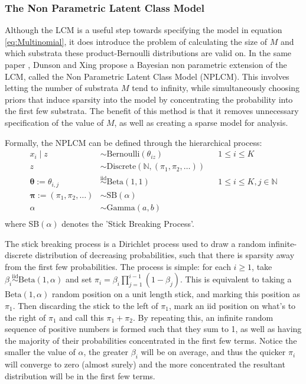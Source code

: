 \documentclass[10pt,a4paper,notitlepage]{article}
\newcommand{\N}{\mathbb{N}}
\newcommand{\iid}{\stackrel{\text{iid}}{\sim}}
\begin{document}
\subsubsection*{The Non Parametric Latent Class Model}
Although the LCM is a useful step towards specifying the model in equation \eqref{eq:Multinomial}, it does introduce the problem of calculating the size of $M$ and which substrata these product-Bernoulli distributions are valid on. In the same paper \cite{BinomialMixingGood}, Dunson and Xing propose a Bayesian non parametric extension of the LCM, called the Non Parametric Latent Class Model (NPLCM). This involves letting the number of substrata $M$ tend to infinity, while simultaneously choosing priors that induce sparsity into the model by concentrating the probability into the first few substrata. The benefit of this method is that it removes unnecessary specification of the value of $M$, as well as creating a sparse model for analysis.

Formally, the NPLCM can be defined through the hierarchical process:
\begin{align*}
x_{i} \mid z &\sim \text{Bernoulli}(\theta_{iz})  & &1\leq i\leq K\\
z &\sim \text{Discrete}(\N,(\pi_{1},\pi_{2}, \hdots)) & &\\
\bm{\theta}:= \theta_{i,j} &\iid \text{Beta}(1,1) & &1\leq i\leq K, j\in\N\\
\bm{\pi} := (\pi_{1},\pi_{2},\hdots ) &\sim \text{SB}(\alpha) &&\\
\alpha &\sim \text{Gamma}(a,b) &&\\
\end{align*}
where SB$(\alpha)$ denotes the 'Stick Breaking Process'.

The stick breaking process is a Dirichlet process used to draw a random infinite-discrete distribution of decreasing probabilities, such that there is sparsity away from the first few probabilities. The process is simple: for each $i\geq 1$, take $\beta_{i}\iid\text{Beta}(1,\alpha)$ and set $\pi_{i}=\beta_{i}\prod_{j=1}^{i-1}(1-\beta_{j})$. This is equivalent to taking a $\text{Beta}(1,\alpha)$ random position on a unit length stick, and marking this position as $\pi_{1}$. Then discarding the stick to the left of $\pi_{1}$, mark an iid position on what's to the right of $\pi_{1}$ and call this $\pi_{1}+\pi_{2}$. By repeating this, an infinite random sequence of positive numbers is formed such that they sum to 1, as well as having the majority of their probabilities concentrated in the first few terms. Notice the smaller the value of $\alpha$, the greater $\beta_{i}$ will be on average, and thus the quicker $\pi_{i}$ will converge to zero (almost surely) and the more concentrated the resultant distribution will be in the first few terms. 
\end{document}
